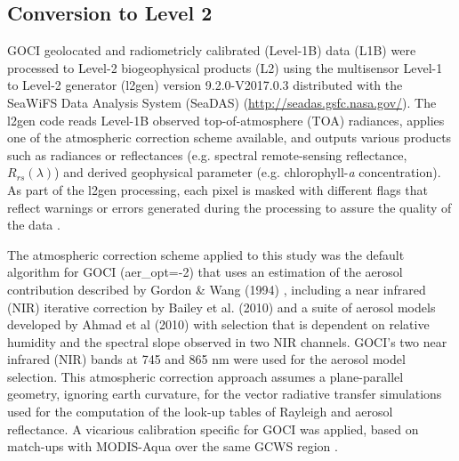 \documentclass[remotesensing,article,submit,moreauthors,pdftex,10pt,a4paper]{Definitions/mdpi}
\begin{document}
\subsection{Conversion to Level 2}
GOCI geolocated and radiometricly calibrated (Level-1B) data (L1B) were processed to Level-2 biogeophysical products (L2) using the multisensor Level-1 to Level-2 generator (l2gen) version 9.2.0-V2017.0.3 distributed with the SeaWiFS Data Analysis System (SeaDAS) (\url{http://seadas.gsfc.nasa.gov/}). The l2gen code reads Level-1B observed top-of-atmosphere (TOA) radiances, applies one of the atmospheric correction scheme available, and outputs various products such as radiances or reflectances (e.g. spectral remote-sensing reflectance, $R_{rs}(\lambda)$) and derived geophysical parameter (e.g. chlorophyll-{\it a} concentration). As part of the l2gen processing, each pixel is masked with different flags that reflect warnings or errors generated during the processing to assure the quality of the data \cite{Bailey2006}. 


The atmospheric correction scheme applied to this study was the default algorithm for GOCI (aer\_opt=-2) that uses an estimation of the aerosol contribution described by Gordon \& Wang (1994) \cite{Gordon1994}, including a near infrared (NIR) iterative correction by Bailey et al. (2010) \cite{Bailey2010} and a suite of aerosol models developed by Ahmad et al (2010) \cite{Ahmad2010} with selection that is dependent on relative humidity and the spectral slope observed in two NIR channels. GOCI's two near infrared (NIR) bands at 745 and 865 nm were used for the aerosol model selection. This atmospheric correction approach assumes a plane-parallel geometry, ignoring earth curvature, for the vector radiative transfer simulations used for the computation of the look-up tables of Rayleigh and aerosol reflectance. A vicarious calibration specific for GOCI was applied, based on match-ups with MODIS-Aqua over the same GCWS region \cite{Concha_2018a}. 
\end{document}
